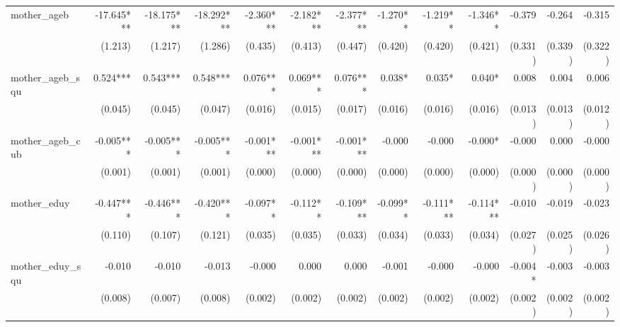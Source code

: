\begin{tabular}{lrrrrrrrrrrrr}
mother\_ageb                                &   -17.645*** &   -18.175*** &   -18.292*** &    -2.360*** &    -2.182*** &    -2.377*** &     -1.270** &     -1.219** &     -1.346** &       -0.379 &       -0.264 &       -0.315 \\ 
                                            &      (1.213) &      (1.217) &      (1.286) &      (0.435) &      (0.413) &      (0.447) &      (0.420) &      (0.420) &      (0.421) &      (0.331) &      (0.339) &      (0.322) \\ 
mother\_ageb\_squ                           &     0.524*** &     0.543*** &     0.548*** &     0.076*** &     0.069*** &     0.076*** &       0.038* &       0.035* &       0.040* &        0.008 &        0.004 &        0.006 \\ 
                                            &      (0.045) &      (0.045) &      (0.047) &      (0.016) &      (0.015) &      (0.017) &      (0.016) &      (0.016) &      (0.016) &      (0.013) &      (0.013) &      (0.012) \\ 
mother\_ageb\_cub                           &    -0.005*** &    -0.005*** &    -0.005*** &    -0.001*** &    -0.001*** &    -0.001*** &       -0.000 &       -0.000 &      -0.000* &       -0.000 &        0.000 &       -0.000 \\ 
                                            &      (0.001) &      (0.001) &      (0.001) &      (0.000) &      (0.000) &      (0.000) &      (0.000) &      (0.000) &      (0.000) &      (0.000) &      (0.000) &      (0.000) \\ 
mother\_eduy                                &    -0.447*** &    -0.446*** &    -0.420*** &     -0.097** &     -0.112** &    -0.109*** &     -0.099** &    -0.111*** &    -0.114*** &       -0.010 &       -0.019 &       -0.023 \\ 
                                            &      (0.110) &      (0.107) &      (0.121) &      (0.035) &      (0.035) &      (0.033) &      (0.034) &      (0.033) &      (0.034) &      (0.027) &      (0.025) &      (0.026) \\ 
mother\_eduy\_squ                           &       -0.010 &       -0.010 &       -0.013 &       -0.000 &        0.000 &        0.000 &       -0.001 &       -0.000 &       -0.000 &      -0.004* &       -0.003 &       -0.003 \\ 
                                            &      (0.008) &      (0.007) &      (0.008) &      (0.002) &      (0.002) &      (0.002) &      (0.002) &      (0.002) &      (0.002) &      (0.002) &      (0.002) &      (0.002) \\ 

\end{tabular}
